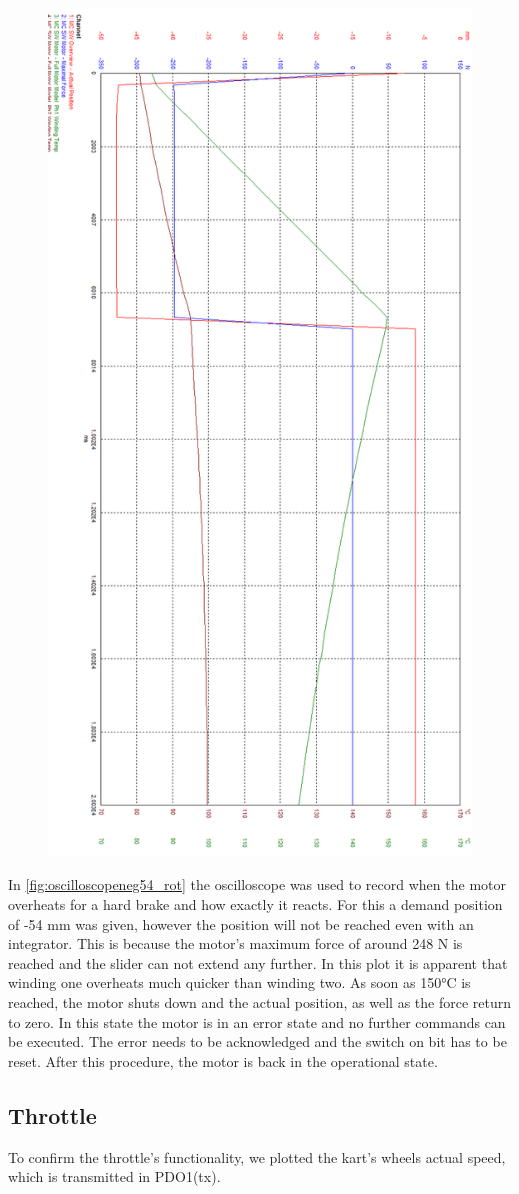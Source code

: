 \begin{figure}
	\centering
	\includegraphics[width=0.7\linewidth]{pictures_figures/oscilloscope_neg54_rot}
	\caption{}
	\label{fig:oscilloscopeneg54rot}
\end{figure}


In \cref{fig:oscilloscopeneg54_rot} the oscilloscope was used to record when the motor overheats for a hard brake and how exactly it reacts. For this a demand position of -54 mm was given, however the position will not be reached even with an integrator. This is because the motor's maximum force of around 248 N is reached and the slider can not extend any further. In this plot it is apparent that winding one overheats much quicker than winding two. As soon as 150°C is reached, the motor shuts down and the actual position, as well as the force return to zero. In this state the motor is in an error state and no further commands can be executed. The error needs to be acknowledged and the switch on bit has to be reset. After this procedure, the motor is back in the operational state.

\newpage

\subsection{Throttle}

To confirm the throttle's functionality, we plotted the kart's wheels actual speed, which is transmitted in PDO1(tx). 
